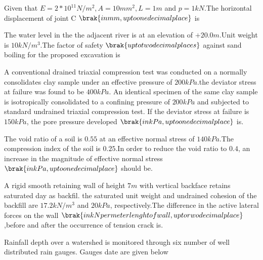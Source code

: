  Given that $E = 2 * 10^{11} N/m^{2},A=10 mm^{2},L=1 m$ and $p=1 kN$.The horizontal displacement of joint C $\brak{in mm,up to one decimal place}$ is\\

 \item The water level in the the adjacent river is at an elevation of $+20.0 m$.Unit weight is $10 kN/m^{3}$.The factor of safety $\brak{up to two decimal places}$ against sand boiling for the proposed excavation is \\
\item A conventional drained triaxial compression test was conducted  on a normally consolidates clay sample under an effective pressure of $200 kPa$.the deviator stress at failure was found to be $400 kPa$. An identical specimen of the same clay sample is isotropically consolidated to a confining pressure of $200 kPa$ and subjected to standard undrained triaxial compression test. If the deviator stress at failure is $150 kPa$, the pore pressure developed $\brak{in kPa, up to one decimal place} $ is.\\
\item The void ratio of a soil is $0.55$ at an effective normal stress of $140 kPa$.The compression index of the soil is $0.25$.In order to reduce the void ratio to $0.4$, an increase in the magnitude of effective normal stress $\brak{in kPa,up to one decimal place}$ should be.\\
\item A rigid smooth retaining wall of height $7 m$ with vertical backface retains saturated day as backfil. the saturated unit weight and undrained cohesion of the backfill are $17.2 kN/m^{3}$ and $20 kPa$, respectively.The difference in the active lateral forces on the wall $\brak{in kN per meter lenght of wall,up to rwo decimal place}$,before and after the occurrence of tension crack is.\\
\item Rainfall depth over a watershed is monitored through six number of well distributed rain gauges. Gauges date are given below\\

